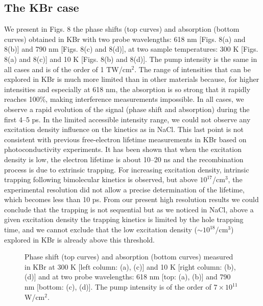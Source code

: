 \documentclass[aps,prb,reprint]{revtex4-2}
\begin{document}
\subsection{The KBr case}

We present in Figs. 8 the phase shifts (top curves) and absorption (bottom curves) obtained in KBr with two probe wavelengths: 618 nm [Figs. 8(a) and 8(b)] and 790 nm [Figs. 8(c) and 8(d)], at two sample temperatures: 300 K [Figs. 8(a) and 8(c)] and 10 K [Figs. 8(b) and 8(d)]. The pump intensity is the same in all cases and is of the order of 1 TW/cm$^2$. The range of intensities that can be explored in KBr is much more limited than in other materials because, for higher intensities and especially at 618 nm, the absorption is so strong that it rapidly reaches 100\%, making interference measurements impossible. In all cases, we observe a rapid evolution of the signal (phase shift and absorption) during the first 4--5 ps. In the limited accessible intensity range, we could not observe any excitation density influence on the kinetics as in NaCl. This last point is not consistent with previous free-electron lifetime measurements in KBr based on photoconductivity experiments.\cite{22} It has been shown that when the excitation density is low, the electron lifetime is about 10--20 ns and the recombination process is due to extrinsic trapping. For increasing excitation density, intrinsic trapping following bimolecular kinetics is observed, but above $10^{17}$/cm$^3$, the experimental resolution did not allow a precise determination of the lifetime, which becomes less than 10 ps. From our present high resolution results we could conclude that the trapping is not sequential but as we noticed in NaCl, above a given excitation density the trapping kinetics is limited by the hole trapping time, and we cannot exclude that the low excitation density ($\sim 10^{18}$/cm$^3$) explored in KBr is already above this threshold.

\begin{figure}[ht]
    \centering
    \caption{Phase shift (top curves) and absorption (bottom curves) measured in KBr at 300 K [left column: (a), (c)] and 10 K [right column: (b), (d)] and at two probe wavelengths: 618 nm [top: (a), (b)] and 790 nm [bottom: (c), (d)]. The pump intensity is of the order of $7\times10^{11}$ W/cm$^2$.}
    \label{fig:kbr}
\end{figure}
\end{document}
